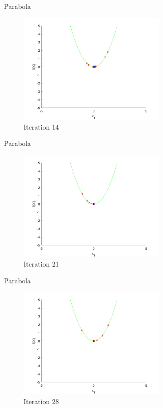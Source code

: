 \documentclass[xcolor=table]{beamer}
\begin{document}
\begin{frame}{Parabola}
  \begin{figure}[h]
  \begin{center}
    \includegraphics[width=0.65\textwidth]{img/smpl/circ/loa-iter-14}
    \caption{Iteration 14}
  \end{center}
  \end{figure}
\end{frame}
\begin{frame}{Parabola}
  \begin{figure}[h]
  \begin{center}
    \includegraphics[width=0.65\textwidth]{img/smpl/circ/loa-iter-21}
    \caption{Iteration 21}
  \end{center}
  \end{figure}
\end{frame}
\begin{frame}{Parabola}
  \begin{figure}[h]
  \begin{center}
    \includegraphics[width=0.65\textwidth]{img/smpl/circ/loa-iter-28}
    \caption{Iteration 28}
  \end{center}
  \end{figure}
\end{frame}
\end{document}
